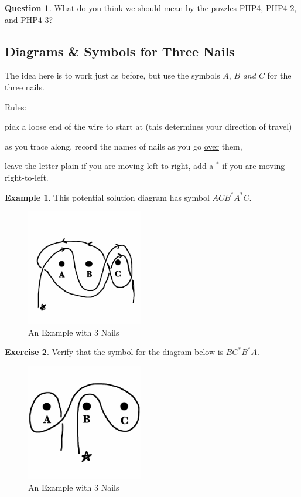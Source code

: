 \documentclass[12pt,letterpaper]{article}
\theoremstyle{definition}
\newtheorem{question}{Question}
\newtheorem{example}{Example}
\newtheorem{exercise}[question]{Exercise}
\begin{document}
\begin{question}
What do you think we should mean by the puzzles PHP4, PHP4-2, and PHP4-3?
\end{question}


\subsection*{Diagrams \& Symbols for Three Nails}

The idea here is to work just as before, but use the symbols $A$, $B$ \emph{and $C$} for the three nails.

Rules:
\begin{compactitem}
\item pick a loose end of the wire to start at (this determines your direction of travel)
\item as you trace along, record the names of nails as you go \underline{over} them,
\item leave the letter plain if you are moving left-to-right, add a ${}^*$ if you are moving right-to-left.
\end{compactitem}

\begin{example}
This potential solution diagram has symbol $ACB^*A^*C$.
\begin{figure}[h]
\centering
\includegraphics[height=2in]{rgp03pics/ACBsAsC.png}
\caption{An Example with 3 Nails}
\end{figure}
\end{example}

\begin{exercise}\label{exercise:mainex}
Verify that the symbol for the diagram below is $BC^*B^*A$.
\begin{figure}[h]
\centering
\includegraphics[height=2in]{rgp03pics/BCsBsA.png}
\caption{An Example with 3 Nails}
\end{figure}
\end{exercise}
\end{document}
